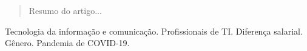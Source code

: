 \begin{abstract}
	Resumo do artigo...
\end{abstract}

\begin{IEEEkeywords}
	Tecnologia da informação e comunicação. Profissionais de TI. Diferença salarial. Gênero. Pandemia de COVID-19.
\end{IEEEkeywords}